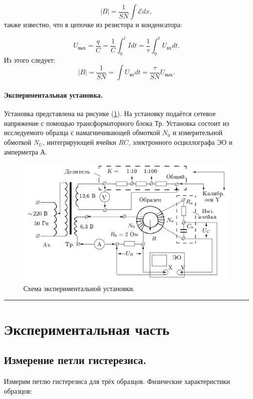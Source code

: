 \documentclass[a4paper,12pt]{article} %
\begin{document}
\[ |B| = \frac{1}{SN} \int \mathcal{E} dx, \]
также известно, что в цепочке из резистора и конденсатора:

\[ U_\text{вых} = \frac{q}{C} = \frac{1}{C}\int_0^t Idt = \frac{1}{\tau} \int_0^t U_\text{вх} dt. \]
Из этого следует:
\[ |B| = \frac{1}{SN} = \int U_\text{вх} dt = \frac{\tau}{SN}U_\text{вых}.\]

\paragraph{Экспериментальная установка.} Установка представлена на рисунке (\ref{ust}). На установку подаётся сетевое напряжение с помощью трансформаторного блока Тр. Установка состоит из исследуемого образца с намагничивающей обмоткой $N_0$ и измерительной обмоткой $N_U$, интегрирующей ячейки $RC$, электронного осциллографа ЭО и амперметра А.

\begin{figure}[h]
\begin{center}
\includegraphics[width=5in]{scheme.png}
\caption{Схема экспериментальной установки.}
\label{ust}
\end{center}
\end{figure}

\medskip\hrule\medskip

\section{Экспериментальная часть}

\subsection{Измерение петли гистерезиса.}

\paragraph{} Измерим петлю гистерезиса для трёх образцов. Физические характеристики образцов:
\end{document}
